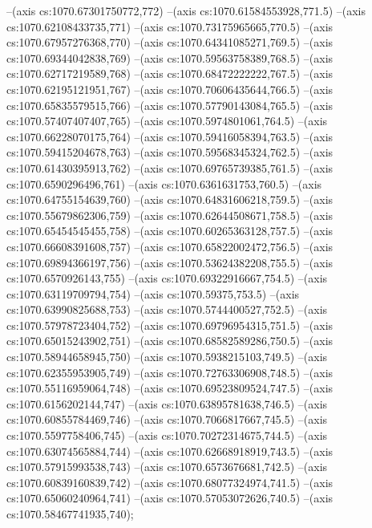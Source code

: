 --(axis cs:1070.67301750772,772)
--(axis cs:1070.61584553928,771.5)
--(axis cs:1070.62108433735,771)
--(axis cs:1070.73175965665,770.5)
--(axis cs:1070.67957276368,770)
--(axis cs:1070.64341085271,769.5)
--(axis cs:1070.69344042838,769)
--(axis cs:1070.59563758389,768.5)
--(axis cs:1070.62717219589,768)
--(axis cs:1070.68472222222,767.5)
--(axis cs:1070.62195121951,767)
--(axis cs:1070.70606435644,766.5)
--(axis cs:1070.65835579515,766)
--(axis cs:1070.57790143084,765.5)
--(axis cs:1070.57407407407,765)
--(axis cs:1070.5974801061,764.5)
--(axis cs:1070.66228070175,764)
--(axis cs:1070.59416058394,763.5)
--(axis cs:1070.59415204678,763)
--(axis cs:1070.59568345324,762.5)
--(axis cs:1070.61430395913,762)
--(axis cs:1070.69765739385,761.5)
--(axis cs:1070.6590296496,761)
--(axis cs:1070.6361631753,760.5)
--(axis cs:1070.64755154639,760)
--(axis cs:1070.64831606218,759.5)
--(axis cs:1070.55679862306,759)
--(axis cs:1070.62644508671,758.5)
--(axis cs:1070.65454545455,758)
--(axis cs:1070.60265363128,757.5)
--(axis cs:1070.66608391608,757)
--(axis cs:1070.65822002472,756.5)
--(axis cs:1070.69894366197,756)
--(axis cs:1070.53624382208,755.5)
--(axis cs:1070.6570926143,755)
--(axis cs:1070.69322916667,754.5)
--(axis cs:1070.63119709794,754)
--(axis cs:1070.59375,753.5)
--(axis cs:1070.63990825688,753)
--(axis cs:1070.5744400527,752.5)
--(axis cs:1070.57978723404,752)
--(axis cs:1070.69796954315,751.5)
--(axis cs:1070.65015243902,751)
--(axis cs:1070.68582589286,750.5)
--(axis cs:1070.58944658945,750)
--(axis cs:1070.5938215103,749.5)
--(axis cs:1070.62355953905,749)
--(axis cs:1070.72763306908,748.5)
--(axis cs:1070.55116959064,748)
--(axis cs:1070.69523809524,747.5)
--(axis cs:1070.6156202144,747)
--(axis cs:1070.63895781638,746.5)
--(axis cs:1070.60855784469,746)
--(axis cs:1070.7066817667,745.5)
--(axis cs:1070.5597758406,745)
--(axis cs:1070.70272314675,744.5)
--(axis cs:1070.63074565884,744)
--(axis cs:1070.62668918919,743.5)
--(axis cs:1070.57915993538,743)
--(axis cs:1070.6573676681,742.5)
--(axis cs:1070.60839160839,742)
--(axis cs:1070.68077324974,741.5)
--(axis cs:1070.65060240964,741)
--(axis cs:1070.57053072626,740.5)
--(axis cs:1070.58467741935,740);

